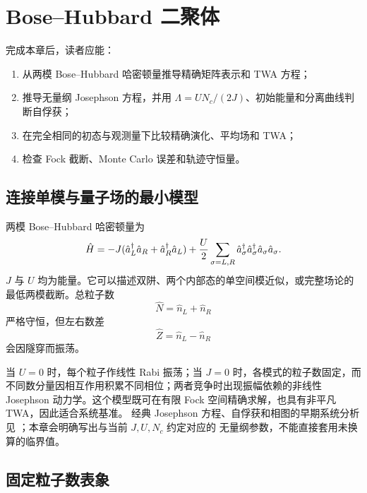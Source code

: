 \chapter{Bose--Hubbard 二聚体}
\label{ch:dimer}

\begin{learningobjectives}
完成本章后，读者应能：
\begin{enumerate}
  \item 从两模 Bose--Hubbard 哈密顿量推导精确矩阵表示和 TWA 方程；
  \item 推导无量纲 Josephson 方程，并用 $\Lambda=UN_c/(2J)$、初始能量和分离曲线判断自俘获；
  \item 在完全相同的初态与观测量下比较精确演化、平均场和 TWA；
  \item 检查 Fock 截断、Monte Carlo 误差和轨迹守恒量。
\end{enumerate}
\end{learningobjectives}

\section{连接单模与量子场的最小模型}

两模 Bose--Hubbard 哈密顿量为
\begin{equation}
  \hat H=-J(\hat a^{\dagger}_L\hat a_R+\hat a^{\dagger}_R\hat a_L)
  +\frac{U}{2}\sum_{\sigma=L,R}
  \hat a^{\dagger}_\sigma\hat a^{\dagger}_\sigma\hat a_\sigma\hat a_\sigma.
  \label{eq:dimer-hamiltonian}
\end{equation}
$J$ 与 $U$ 均为能量。它可以描述双阱、两个内部态的单空间模近似，或完整场论的最低两模截断。总粒子数
\begin{equation}
  \hat N=\hat n_L+\hat n_R
\end{equation}
严格守恒，但左右数差
\begin{equation}
  \hat Z=\hat n_L-\hat n_R
\end{equation}
会因隧穿而振荡。

当 $U=0$ 时，每个粒子作线性 Rabi 振荡；当 $J=0$ 时，各模式的粒子数固定，而不同数分量因相互作用积累不同相位；两者竞争时出现振幅依赖的非线性 Josephson 动力学。这个模型既可在有限 Fock 空间精确求解，也具有非平凡 TWA，因此适合系统基准。
经典 Josephson 方程、自俘获和相图的早期系统分析见
\cite{Smerzi1997,Raghavan1999}；本章会明确写出与当前 $J,U,N_c$ 约定对应的
无量纲参数，不能直接套用未换算的临界值。

\section{固定粒子数表象}

